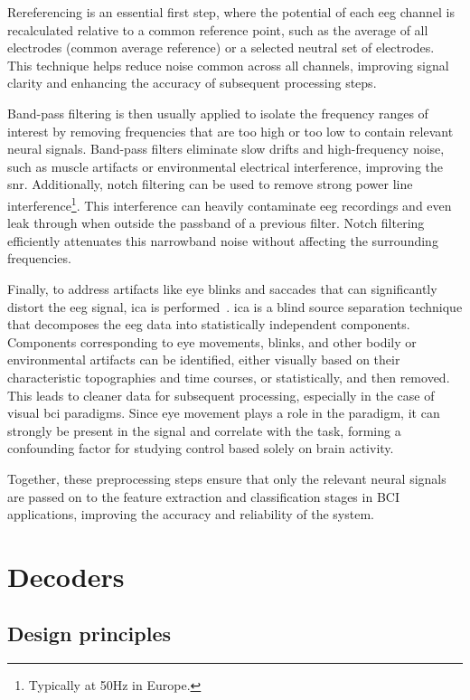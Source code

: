 Rereferencing is an essential first step, where the potential of each \ac{eeg} channel
is recalculated relative to a common reference point, such as the average of all
electrodes (common average reference) or a selected neutral set of electrodes.
This technique helps reduce noise common across all channels, improving signal clarity
and enhancing the accuracy of subsequent processing steps.

Band-pass filtering is then usually applied to isolate the frequency ranges of interest
by removing frequencies that are too high or too low to contain relevant neural signals.
Band-pass filters eliminate slow drifts and high-frequency noise, such as muscle
artifacts or environmental electrical interference, improving the \ac{snr}.
Additionally, notch filtering can be used to remove strong power line interference\footnote{%
Typically at 50Hz in Europe.}.
This interference can heavily contaminate \ac{eeg} recordings and even leak through when
outside the passband of a previous filter.
Notch filtering efficiently attenuates this narrowband noise without affecting the
surrounding frequencies.

Finally, to address artifacts like eye blinks and saccades that can significantly
distort the \ac{eeg} signal, \ac{ica} is performed~\cite{Delorme2007}.
\ac{ica} is a blind source separation technique that decomposes the \ac{eeg} data into
statistically independent components.
Components corresponding to eye movements, blinks, and other bodily or environmental
artifacts can be identified, either visually based on their characteristic topographies
and time courses, or statistically, and then removed.
This leads to cleaner data for subsequent processing, especially in the case of visual
\ac{bci} paradigms.
Since eye movement plays a role in the paradigm, it can strongly be present in the
signal and correlate with the task, forming a confounding factor for studying control
based solely on brain activity.

Together, these preprocessing steps ensure that only the relevant neural signals are
passed on to the feature extraction and classification stages in BCI applications,
improving the accuracy and reliability of the system.

\section{Decoders}
\label{sec:bci/decoding}

\subsection{Design principles}

